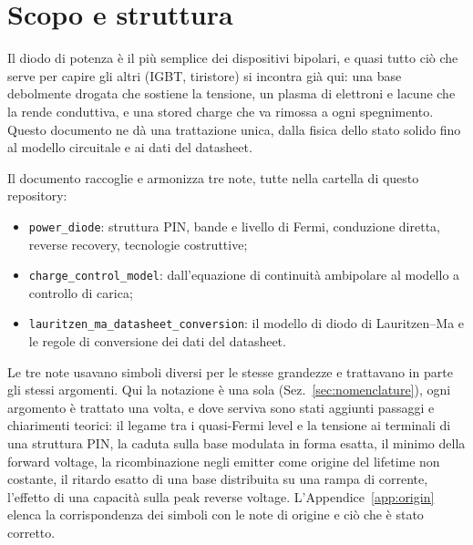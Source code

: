 \documentclass[10pt,a4paper]{scrartcl}
\begin{document}

\tableofcontents
\newpage

\section{Scopo e struttura}
\label{sec:scope}
Il diodo di potenza è il più semplice dei dispositivi bipolari, e quasi tutto ciò che serve per capire gli altri (IGBT, tiristore) si incontra già qui: una base debolmente drogata che sostiene la tensione, un plasma di elettroni e lacune che la rende conduttiva, e una stored charge che va rimossa a ogni spegnimento. Questo documento ne dà una trattazione unica, dalla fisica dello stato solido fino al modello circuitale e ai dati del datasheet.

Il documento raccoglie e armonizza tre note, tutte nella cartella {\def\UrlBreaks{\do\/\do\_}} di questo repository:
\begin{itemize}
\item \texttt{power\_diode}: struttura PIN, bande e livello di Fermi, conduzione diretta, reverse recovery, tecnologie costruttive;
\item \texttt{charge\_control\_model}: dall'equazione di continuità ambipolare al modello a controllo di carica;
\item \texttt{lauritzen\_ma\_datasheet\_conversion}: il modello di diodo di Lauritzen--Ma e le regole di conversione dei dati del datasheet.
\end{itemize}
Le tre note usavano simboli diversi per le stesse grandezze e trattavano in parte gli stessi argomenti. Qui la notazione è una sola (Sez.~\ref{sec:nomenclature}), ogni argomento è trattato una volta, e dove serviva sono stati aggiunti passaggi e chiarimenti teorici: il legame tra i quasi-Fermi level e la tensione ai terminali di una struttura PIN, la caduta sulla base modulata in forma esatta, il minimo della forward voltage, la ricombinazione negli emitter come origine del lifetime non costante, il ritardo esatto di una base distribuita su una rampa di corrente, l'effetto di una capacità sulla peak reverse voltage. L'Appendice~\ref{app:origin} elenca la corrispondenza dei simboli con le note di origine e ciò che è stato corretto.
\end{document}
